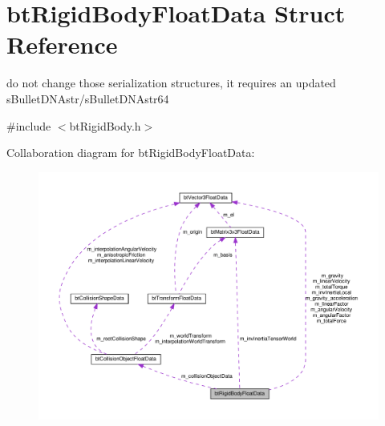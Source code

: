 \hypertarget{structbtRigidBodyFloatData}{}\section{bt\+Rigid\+Body\+Float\+Data Struct Reference}
\label{structbtRigidBodyFloatData}


do not change those serialization structures, it requires an updated s\+Bullet\+D\+N\+Astr/s\+Bullet\+D\+N\+Astr64  




{\ttfamily \#include $<$bt\+Rigid\+Body.\+h$>$}



Collaboration diagram for bt\+Rigid\+Body\+Float\+Data\+:
\nopagebreak
\begin{figure}[H]
\begin{center}
\leavevmode
\includegraphics[width=350pt]{structbtRigidBodyFloatData__coll__graph}
\end{center}
\end{figure}

